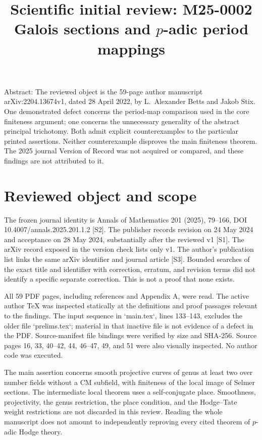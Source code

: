 \documentclass[10pt]{article}
\title{Scientific initial review: M25-0002
Galois sections and \(p\)-adic period mappings}
\author{}
\date{}
\begin{document}
\maketitle
Abstract: The reviewed object is the 59-page author manuscript arXiv:2204.13674v1, dated 28 April 2022, by L. Alexander Betts and Jakob Stix. One demonstrated defect concerns the period-map comparison used in the core finiteness argument; one concerns the unnecessary generality of the abstract principal trichotomy. Both admit explicit counterexamples to the particular printed assertions. Neither counterexample disproves the main finiteness theorem. The 2025 journal Version of Record was not acquired or compared, and these findings are not attributed to it.\par
\section*{Reviewed object and scope}
The frozen journal identity is Annals of Mathematics 201 (2025), 79–166, DOI 10.4007/annals.2025.201.1.2 [S2]. The publisher records revision on 24 May 2024 and acceptance on 28 May 2024, substantially after the reviewed v1 [S1]. The arXiv record exposed in the version check lists only v1. The author’s publication list links the same arXiv identifier and journal article [S3]. Bounded searches of the exact title and identifier with correction, erratum, and revision terms did not identify a specific separate correction. This is not a proof that none exists.\par
All 59 PDF pages, including references and Appendix A, were read. The active author TeX was inspected statically at the definitions and proof passages relevant to the findings. The input sequence in `main.tex`, lines 133–143, excludes the older file `prelims.tex`; material in that inactive file is not evidence of a defect in the PDF. Source-manifest file bindings were verified by size and SHA-256. Source pages 16, 33, 40–42, 44, 46–47, 49, and 51 were also visually inspected. No author code was executed.\par
The main assertion concerns smooth projective curves of genus at least two over number fields without a CM subfield, with finiteness of the local image of Selmer sections. The intermediate local theorem uses a self-conjugate place. Smoothness, projectivity, the genus restriction, the place condition, and the Hodge–Tate weight restrictions are not discarded in this review. Reading the whole manuscript does not amount to independently reproving every cited theorem of \(p\)-adic Hodge theory.\par
\end{document}
